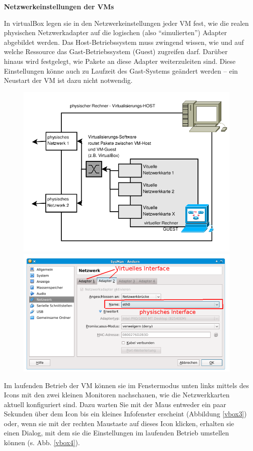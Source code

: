 \documentclass[paper=a4,fontsize=11pt]{scrartcl}%
\numberwithin{equation}{section}
\begin{document}
\begin{center}
\Large{\textbf{Netzwerkeinstellungen der VMs}}
\end{center}
In virtualBox legen sie in den Netzwerkeinstellungen jeder VM fest, wie die realen physischen Netzwerkadapter auf die logischen (also \enquote{simulierten}) Adapter abgebildet werden. Das Host-Betriebssystem muss zwingend wissen, wie und auf welche Ressource das Gast-Betriebssystem (Guest) zugreifen darf. Darüber hinaus wird festgelegt, wie Pakete an diese Adapter weiterzuleiten sind. Diese Einstellungen könne auch zu Laufzeit des Gast-Systems geändert werden -- ein Neustart der VM ist dazu nicht notwendig.
\begin{figure}[H]
	\centering
	\includegraphics[scale=0.4]{vbox1}
	\includegraphics[scale=0.4]{vbox2}
\end{figure}
Im laufenden Betrieb der VM können sie im Fenstermodus unten links mittels des Icons mit den zwei kleinen Monitoren nachschauen, wie die Netzwerkkarten aktuell konfiguriert sind. Dazu warten Sie mit der Maus entweder ein paar Sekunden über dem Icon bis ein kleines Infofenster erscheint (Abbildung \ref{vbox3}) oder, wenn sie mit der rechten Maustaste auf dieses Icon klicken, erhalten sie einen Dialog, mit dem sie die Einstellungen im laufenden Betrieb umstellen können (s. Abb. \ref{vbox4}).
\end{document}
